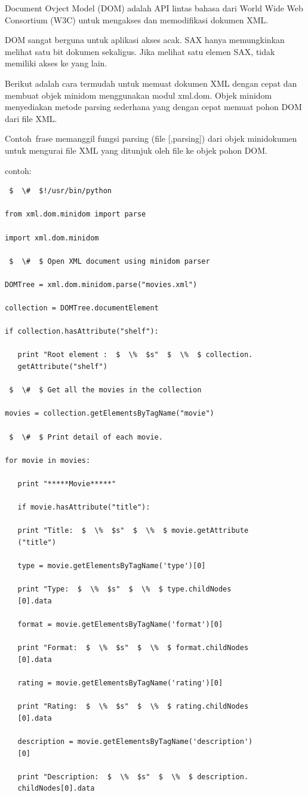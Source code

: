 \hspace*{0.5in} Document Ovject Model (DOM) adalah API lintas bahasa dari World Wide Web Consortium (W3C) untuk mengakses dan memodifikasi dokumen XML. 
 
\hspace*{0.5in} DOM sangat berguna untuk aplikasi akses acak. SAX hanya memungkinkan melihat satu bit dokumen sekaligus. Jika melihat satu elemen SAX, tidak memiliki akses ke yang lain. 
 
\hspace*{0.5in} Berikut adalah cara termudah untuk memuat dokumen XML dengan cepat dan membuat objek minidom menggunakan modul xml.dom. Objek minidom menyediakan metode parsing sederhana yang dengan cepat memuat pohon DOM dari file XML. 
 
\hspace*{0.5in} Contoh~frase memanggil fungsi  parsing (file [,parsing]) dari objek minidokumen untuk mengurai file XML yang ditunjuk oleh file ke objek pohon DOM. 

contoh:
\begin{verbatim} 
 $  \#  $!/usr/bin/python 
 
from xml.dom.minidom import parse 
 
import xml.dom.minidom 
 
 $  \#  $ Open XML document using minidom parser 
 
DOMTree = xml.dom.minidom.parse("movies.xml") 
 
collection = DOMTree.documentElement 
 
if collection.hasAttribute("shelf"): 
 
   print "Root element :  $  \%  $s"  $  \%  $ collection.
   getAttribute("shelf") 
 
 $  \#  $ Get all the movies in the collection 
 
movies = collection.getElementsByTagName("movie") 
 
 $  \#  $ Print detail of each movie. 
 
for movie in movies: 
 
   print "*****Movie*****" 
 
   if movie.hasAttribute("title"): 
 
   print "Title:  $  \%  $s"  $  \%  $ movie.getAttribute
   ("title") 

   type = movie.getElementsByTagName('type')[0] 
 
   print "Type:  $  \%  $s"  $  \%  $ type.childNodes
   [0].data 
 
   format = movie.getElementsByTagName('format')[0] 
 
   print "Format:  $  \%  $s"  $  \%  $ format.childNodes
   [0].data 
 
   rating = movie.getElementsByTagName('rating')[0] 
 
   print "Rating:  $  \%  $s"  $  \%  $ rating.childNodes
   [0].data 
 
   description = movie.getElementsByTagName('description')
   [0] 
 
   print "Description:  $  \%  $s"  $  \%  $ description.
   childNodes[0].data 
\end{verbatim}

